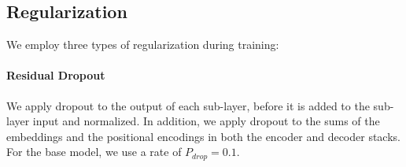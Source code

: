 \subsection{Regularization} \label{sec:reg}

We employ three types of regularization during training:
\paragraph{Residual Dropout} We apply dropout \citep{srivastava2014dropout} to
the output of each sub-layer, before it is added to the sub-layer input and
normalized.   In addition, we apply dropout to the sums of the embeddings and
the positional encodings in both the encoder and decoder stacks.  For the base
model, we use a rate of $P_{drop}=0.1$.



